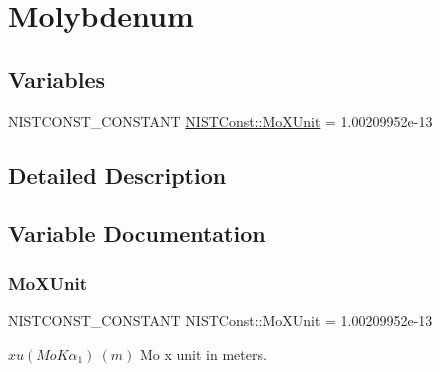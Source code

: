 \hypertarget{group___n_i_s_t_const-_molybdenum}{}\section{Molybdenum}
\label{group___n_i_s_t_const-_molybdenum}
\subsection*{Variables}
\begin{DoxyCompactItemize}
\item 
N\+I\+S\+T\+C\+O\+N\+S\+T\+\_\+\+C\+O\+N\+S\+T\+A\+NT \mbox{\hyperlink{group___n_i_s_t_const-_molybdenum_gae993f805405c16a8feb601813053bc5f}{N\+I\+S\+T\+Const\+::\+Mo\+X\+Unit}} = 1.\+00209952e-\/13
\end{DoxyCompactItemize}


\subsection{Detailed Description}


\subsection{Variable Documentation}
\mbox{\label{group___n_i_s_t_const-_molybdenum_gae993f805405c16a8feb601813053bc5f}} 
\subsubsection{\texorpdfstring{Mo\+X\+Unit}{MoXUnit}}
{\footnotesize\ttfamily N\+I\+S\+T\+C\+O\+N\+S\+T\+\_\+\+C\+O\+N\+S\+T\+A\+NT N\+I\+S\+T\+Const\+::\+Mo\+X\+Unit = 1.\+00209952e-\/13}

$xu(MoK\alpha_1) \ (m)$ Mo x unit in meters. 